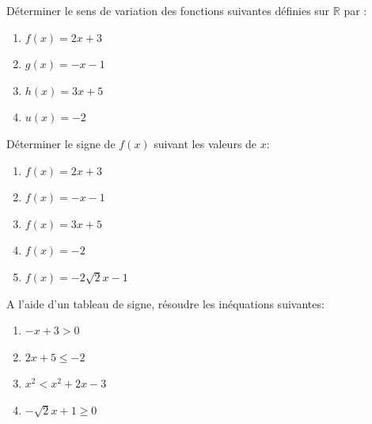 
\begin{exercice}
Déterminer le sens de variation des fonctions suivantes définies sur $\mathbb{R}$ par : 
\setlength{\columnseprule}{0pt}
\begin{multicols}{2}
\begin{enumerate}
\item $f(x)=2x+3$
\item $g(x)=-x-1$
\item $h(x)=3x+5$
\item $u(x)=-2$
\end{enumerate}
 \end{multicols}
\end{exercice}

\begin{exercice}
Déterminer le signe de $f(x)$ suivant les valeurs de $x$: 
\setlength{\columnseprule}{0pt}
\begin{multicols}{2}
\begin{enumerate}
\item $f(x)=2x+3$
\item $f(x)=-x-1$
\item $f(x)=3x+5$
\item $f(x)=-2$
\item $f(x)=-2\sqrt{2}x-1$
\end{enumerate}
 \end{multicols}
\end{exercice}

\begin{exercice}
A l'aide d'un tableau de signe, résoudre les inéquations suivantes: 
\setlength{\columnseprule}{0pt}
\begin{multicols}{2}
\begin{enumerate}
\item $-x+3>0$
\item $2x+5\leq-2$ 
\item $x^2<x^2+2x-3$
\item $-\sqrt{2}x+1\geq 0$
\end{enumerate}
 \end{multicols}
\end{exercice}


